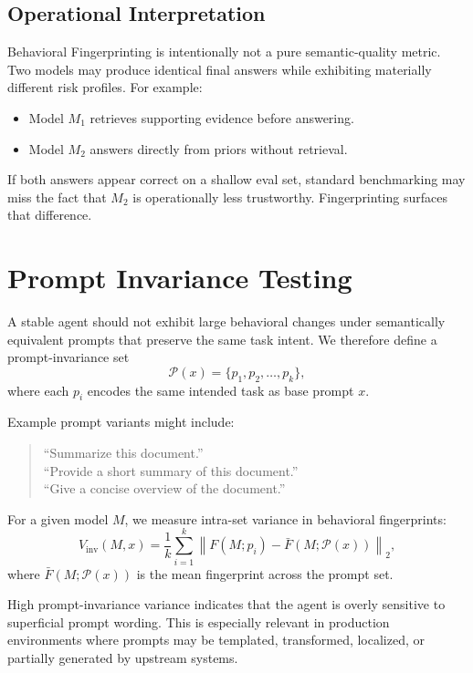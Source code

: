 \documentclass[11pt]{article}
\begin{document}
\subsection{Operational Interpretation}
Behavioral Fingerprinting is intentionally not a pure semantic-quality metric. Two models may produce identical final answers while exhibiting materially different risk profiles. For example:
\begin{itemize}[leftmargin=*]
    \item Model $M_1$ retrieves supporting evidence before answering.
    \item Model $M_2$ answers directly from priors without retrieval.
\end{itemize}

If both answers appear correct on a shallow eval set, standard benchmarking may miss the fact that $M_2$ is operationally less trustworthy. Fingerprinting surfaces that difference.

\section{Prompt Invariance Testing}
A stable agent should not exhibit large behavioral changes under semantically equivalent prompts that preserve the same task intent. We therefore define a prompt-invariance set
\begin{equation}
\mathcal{P}(x) = \{p_1, p_2, \dots, p_k\},
\end{equation}
where each $p_i$ encodes the same intended task as base prompt $x$.

Example prompt variants might include:
\begin{quote}
``Summarize this document.'' \\
``Provide a short summary of this document.'' \\
``Give a concise overview of the document.''
\end{quote}

For a given model $M$, we measure intra-set variance in behavioral fingerprints:
\begin{equation}
V_{\mathrm{inv}}(M, x) = \frac{1}{k} \sum_{i=1}^{k} \left\|F(M; p_i) - \bar{F}(M; \mathcal{P}(x))\right\|_2,
\end{equation}
where $\bar{F}(M; \mathcal{P}(x))$ is the mean fingerprint across the prompt set.

High prompt-invariance variance indicates that the agent is overly sensitive to superficial prompt wording. This is especially relevant in production environments where prompts may be templated, transformed, localized, or partially generated by upstream systems.
\end{document}

